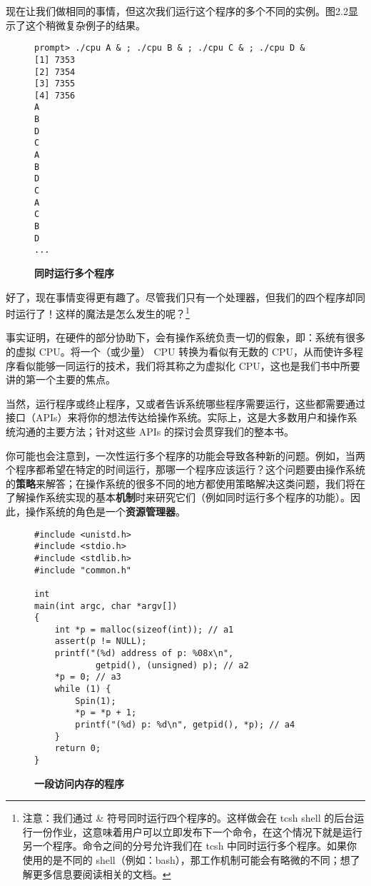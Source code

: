 现在让我们做相同的事情，但这次我们运行这个程序的多个不同的实例。图2.2显示了这个稍微复杂例子的结果。

\begin{figure}[ht]
\begin{verbatim}
prompt> ./cpu A & ; ./cpu B & ; ./cpu C & ; ./cpu D &
[1] 7353
[2] 7354
[3] 7355
[4] 7356
A
B
D
C
A
B
D
C
A
C
B
D
...
\end{verbatim}
\caption{\textbf{同时运行多个程序}}
\end{figure}

好了，现在事情变得更有趣了。尽管我们只有一个处理器，但我们的四个程序却同时运行了！这样的魔法是怎么发生的呢？\footnote{注意：我们通过 \& 符号同时运行四个程序的。这样做会在 tcsh shell 的后台运行一份作业，这意味着用户可以立即发布下一个命令，在这个情况下就是运行另一个程序。命令之间的分号允许我们在 tcsh 中同时运行多个程序。如果你使用的是不同的 shell（例如：bash），那工作机制可能会有略微的不同；想了解更多信息要阅读相关的文档。}

事实证明，在硬件的部分协助下，会有操作系统负责一切的假象，即：系统有很多的虚拟 CPU。将一个（或少量） CPU 转换为看似有无数的 CPU，从而使许多程序看似能够一同运行的技术，我们将其称之为虚拟化 CPU，这也是我们书中所要讲的第一个主要的焦点。

当然，运行程序或终止程序，又或者告诉系统哪些程序需要运行，这些都需要通过接口（APIs）来将你的想法传达给操作系统。实际上，这是大多数用户和操作系统沟通的主要方法；针对这些 APIs 的探讨会贯穿我们的整本书。

你可能也会注意到，一次性运行多个程序的功能会导致各种新的问题。例如，当两个程序都希望在特定的时间运行，那哪一个程序应该运行？这个问题要由操作系统的\textbf{策略}来解答；在操作系统的很多不同的地方都使用策略解决这类问题，我们将在了解操作系统实现的基本\textbf{机制}时来研究它们（例如同时运行多个程序的功能）。因此，操作系统的角色是一个\textbf{资源管理器}。

\begin{figure}[ht]
\begin{lstlisting}  
#include <unistd.h>
#include <stdio.h>
#include <stdlib.h>
#include "common.h"

int
main(int argc, char *argv[])
{
    int *p = malloc(sizeof(int)); // a1 
    assert(p != NULL);
    printf("(%d) address of p: %08x\n",
            getpid(), (unsigned) p); // a2
    *p = 0; // a3
    while (1) {
        Spin(1);
        *p = *p + 1;
        printf("(%d) p: %d\n", getpid(), *p); // a4
    }
    return 0;
} 
\end{lstlisting}
\caption{\textbf{一段访问内存的程序}}
\end{figure}

